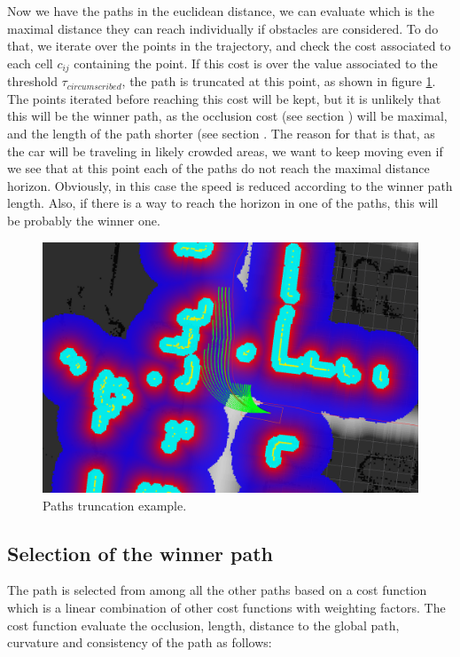 Now we have the paths in the euclidean distance, we can evaluate which is the maximal distance they can reach individually if obstacles are considered. To do that, we iterate over the points in the trajectory, and check the cost associated to each cell $c_{ij}$ containing the point. If this cost is over the value associated to the threshold $\tau_{circumscribed}$, the path is truncated at this point, as shown in figure \ref{fig:cp07_path_truncation}. The points iterated before reaching this cost will be kept, but it is unlikely that this will be the winner path, as the occlusion cost (see section ) will be maximal, and the length of the path shorter (see section . The reason for that is that, as the car will be traveling in likely crowded areas, we want to keep moving even if we see that at this point each of the paths do not reach the maximal distance horizon. Obviously, in this case the speed is reduced according to the winner path length. Also, if there is a way to reach the horizon in one of the paths, this will be probably the winner one.

\begin{figure}[h!]
\centering
\includegraphics{example15}
\caption{Paths truncation example.}\label{fig:cp07_path_truncation}
\end{figure}

\subsection{Selection of the winner path}\label{ch:chapter07_01_04}

The path is selected from among all the other paths based on a cost function which is a linear combination of other cost functions with weighting factors. The cost function evaluate the occlusion, length, distance to the global path, curvature and consistency of the path as follows:

